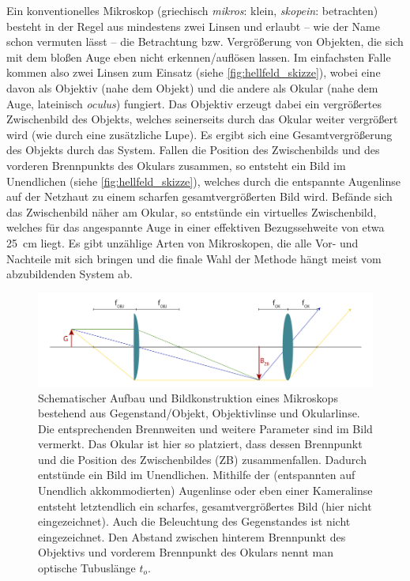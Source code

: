 \documentclass[english, ngerman]{scrartcl}
\begin{document}
Ein konventionelles Mikroskop (griechisch \textit{mikros}: klein, \textit{skopein}: betrachten) besteht in der Regel aus mindestens zwei Linsen und erlaubt -- wie der Name schon vermuten lässt -- die Betrachtung bzw. Vergrößerung von Objekten, die sich mit dem bloßen Auge eben nicht erkennen/auflösen lassen. Im einfachsten Falle kommen also zwei Linsen zum Einsatz (siehe \autoref{fig:hellfeld_skizze}), wobei eine davon als Objektiv (nahe dem Objekt) und die andere als Okular (nahe dem Auge, lateinisch \textit{oculus}) fungiert. Das Objektiv erzeugt dabei ein vergrößertes Zwischenbild des Objekts, welches seinerseits durch das Okular weiter vergrößert wird (wie durch eine zusätzliche Lupe). Es ergibt sich eine Gesamtvergrößerung des Objekts durch das System. Fallen die Position des Zwischenbilds und des vorderen Brennpunkts des Okulars zusammen, so entsteht ein Bild im Unendlichen (siehe \autoref{fig:hellfeld_skizze}), welches durch die entspannte Augenlinse auf der Netzhaut zu einem scharfen gesamtvergrößerten Bild wird. Befände sich das Zwischenbild näher am Okular, so entstünde ein virtuelles Zwischenbild, welches für das angespannte Auge in einer effektiven Bezugssehweite von etwa \SI{25}{cm} liegt. Es gibt unzählige Arten von Mikroskopen, die alle Vor- und Nachteile mit sich bringen und die finale Wahl der Methode hängt meist vom abzubildenden System ab.
%
\begin{figure}[H]
    \centering
    \begin{samepage}
        \includegraphics[width=\linewidth]{fig/Hellfeld.png}
        \caption[Aufbau eines Hellfeld-Transmissionsmikroskops]{Schematischer Aufbau und Bildkonstruktion eines Mikroskops bestehend aus Gegenstand/Objekt, Objektivlinse und Okularlinse. Die entsprechenden Brennweiten und weitere Parameter sind im Bild vermerkt. Das Okular ist hier so platziert, dass dessen Brennpunkt und die Position des Zwischenbildes (ZB) zusammenfallen. Dadurch entstünde ein Bild im Unendlichen. Mithilfe der (entspannten auf Unendlich akkommodierten) Augenlinse oder eben einer Kameralinse entsteht letztendlich ein scharfes, gesamtvergrößertes Bild (hier nicht eingezeichnet). Auch die Beleuchtung des Gegenstandes ist nicht eingezeichnet. Den Abstand zwischen hinterem Brennpunkt des Objektivs und vorderem Brennpunkt des Okulars nennt man optische Tubuslänge $t_o$.}
        \label{fig:hellfeld_skizze}
    \end{samepage}
\end{figure}
%
\end{document}
